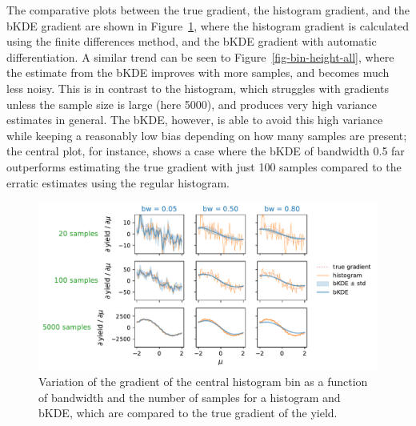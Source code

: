 \documentclass[
  11pt,
  numbers=noendperiod]{book}
\begin{document}
The comparative plots between the true gradient, the histogram gradient,
and the bKDE gradient are shown in Figure~\ref{fig-bin-grad-all}, where
the histogram gradient is calculated using the finite differences
method, and the bKDE gradient with automatic differentiation. A similar
trend can be seen to Figure~\ref{fig-bin-height-all}, where the estimate
from the bKDE improves with more samples, and becomes much less noisy.
This is in contrast to the histogram, which struggles with gradients
unless the sample size is large (here 5000), and produces very high
variance estimates in general. The bKDE, however, is able to avoid this
high variance while keeping a reasonably low bias depending on how many
samples are present; the central plot, for instance, shows a case where
the bKDE of bandwidth 0.5 far outperforms estimating the true gradient
with just 100 samples compared to the erratic estimates using the
regular histogram.

\begin{figure}

{\centering \includegraphics{./diffprog-hep_files/figure-pdf/fig-bin-grad-all-output-1.pdf}

}

\caption{\label{fig-bin-grad-all}Variation of the gradient of the
central histogram bin as a function of bandwidth and the number of
samples for a histogram and bKDE, which are compared to the true
gradient of the yield.}

\end{figure}
\end{document}
